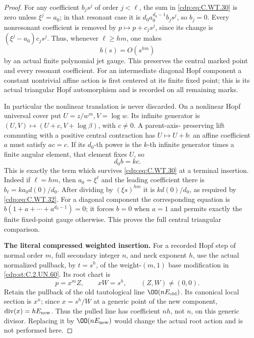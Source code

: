 \begin{proof}
For any coefficient \(b_j s^j\)
of order \(j<\ell\), the sum
in \eqref{cdp:eq:C.WT.30} is zero unless
\(\xi^j=a_0\); in that resonant
case it is
\(d_0 a_0^{d_0-1}b_j s^j\),
so \(b_j=0\). Every nonresonant
coefficient is removed by
\(p\mapsto p+c_j s^j\), since
its change is
\((\xi^j-a_0)c_j s^j\).
Thus, whenever \(\ell\ge hm\),
one makes
\[
                               b(s)=O(s^{hm})
 \tag{C.WT.31}\label{cdp:eq:C.WT.31}
\]
by an actual finite polynomial
jet gauge. This preserves the
central marked point and every
resonant coefficient. For an
intermediate diagonal Hopf
component a constant nontrivial
affine action is first centered
at its finite fixed point;
this is its actual triangular
Hopf automorphism and is
recorded on all remaining
marks.

In particular the nonlinear
translation is never discarded.
On a nonlinear Hopf universal
cover put \(U=z/w^m,V=\log w\).
Its infinite generator is
\((U,V)\mapsto(U+c,V+\log\beta)\),
with \(c\ne0\). A parent-axis-
preserving lift commuting with
a positive central contraction
has \(U\mapsto U+b\):
an affine coefficient \(a\)
must satisfy \(ac=c\).
If its \(d_0\)-th power is the
\(k\)-th infinite generator
times a finite angular element,
that element fixes \(U\), so
\[
                                d_0b=kc.
 \tag{C.WT.32}\label{cdp:eq:C.WT.32}
\]
This is exactly the term which
survives \eqref{cdp:eq:C.WT.30} at a terminal
insertion. Indeed if \(\ell=hm\),
then \(a_0=\xi^{\ell}\) and the
leading coefficient there is
\(b_{\ell}=k a_0d(0)/d_0\).
After dividing by \((\xi s)^{hm}\)
it is \(k d(0)/d_0\), as required
by \eqref{cdp:eq:C.WT.32}. For a diagonal
component the corresponding
equation is
\(b(1+a+\cdots+a^{d_0-1})=0\);
it forces \(b=0\) when \(a=1\)
and permits exactly the finite
fixed-point gauge otherwise.
This proves the full central
triangular comparison.

\par\medskip\noindent\textbf{The literal compressed weighted insertion.}
For a recorded Hopf step of
normal order \(m\), full secondary
integer \(n\), and neck exponent
\(h\), use the actual normalized
pullback, by \(t=s^h\), of the
weight-\((m,1)\) base modification
in \ref{cdp:st:C.2.UN.60}. Its root chart is
\[
       p=x^m Z,\qquad xW=s^h,\qquad (Z,W)\ne(0,0).
 \tag{C.WT.33}\label{cdp:eq:C.WT.33}
\]
Retain the pullback of the old
tautological line \(\OO(nE_{\rm old})\).
Its canonical local section is
\(x^n\); since \(x=s^h/W\) at a
generic point of the new component,
\(\operatorname{div}(x)=hE_{\rm new}\).
Thus the pulled line has coefficient
\(nh\), not \(n\), on this generic
divisor. Replacing it by
\(\OO(nE_{\rm new})\) would change
the actual root action and is not
performed here.


\end{proof}
